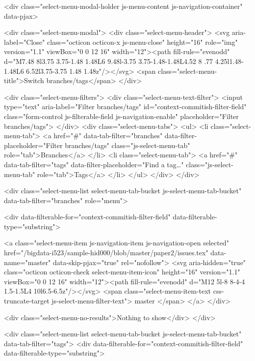   <div class="select-menu-modal-holder js-menu-content js-navigation-container" data-pjax>

    <div class="select-menu-modal">
      <div class="select-menu-header">
        <svg aria-label="Close" class="octicon octicon-x js-menu-close" height="16" role="img" version="1.1" viewBox="0 0 12 16" width="12"><path fill-rule="evenodd" d="M7.48 8l3.75 3.75-1.48 1.48L6 9.48l-3.75 3.75-1.48-1.48L4.52 8 .77 4.25l1.48-1.48L6 6.52l3.75-3.75 1.48 1.48z"/></svg>
        <span class="select-menu-title">Switch branches/tags</span>
      </div>

      <div class="select-menu-filters">
        <div class="select-menu-text-filter">
          <input type="text" aria-label="Filter branches/tags" id="context-commitish-filter-field" class="form-control js-filterable-field js-navigation-enable" placeholder="Filter branches/tags">
        </div>
        <div class="select-menu-tabs">
          <ul>
            <li class="select-menu-tab">
              <a href="#" data-tab-filter="branches" data-filter-placeholder="Filter branches/tags" class="js-select-menu-tab" role="tab">Branches</a>
            </li>
            <li class="select-menu-tab">
              <a href="#" data-tab-filter="tags" data-filter-placeholder="Find a tag…" class="js-select-menu-tab" role="tab">Tags</a>
            </li>
          </ul>
        </div>
      </div>

      <div class="select-menu-list select-menu-tab-bucket js-select-menu-tab-bucket" data-tab-filter="branches" role="menu">

        <div data-filterable-for="context-commitish-filter-field" data-filterable-type="substring">


            <a class="select-menu-item js-navigation-item js-navigation-open selected"
               href="/bigdata-i523/sample-hid000/blob/master/paper2/issues.tex"
               data-name="master"
               data-skip-pjax="true"
               rel="nofollow">
              <svg aria-hidden="true" class="octicon octicon-check select-menu-item-icon" height="16" version="1.1" viewBox="0 0 12 16" width="12"><path fill-rule="evenodd" d="M12 5l-8 8-4-4 1.5-1.5L4 10l6.5-6.5z"/></svg>
              <span class="select-menu-item-text css-truncate-target js-select-menu-filter-text">
                master
              </span>
            </a>
        </div>

          <div class="select-menu-no-results">Nothing to show</div>
      </div>

      <div class="select-menu-list select-menu-tab-bucket js-select-menu-tab-bucket" data-tab-filter="tags">
        <div data-filterable-for="context-commitish-filter-field" data-filterable-type="substring">


